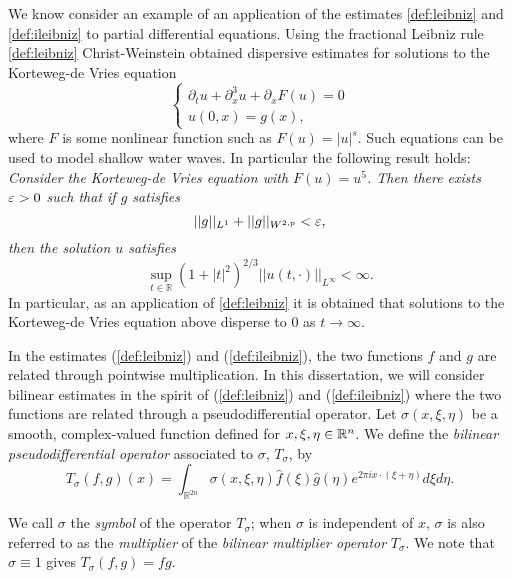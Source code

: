 We know consider an example of an application of the estimates \eqref{def:leibniz} and \eqref{def:ileibniz} to partial differential equations. Using the fractional Leibniz rule \eqref{def:leibniz} Christ-Weinstein \cite{MR1124294} obtained dispersive estimates for solutions to the Korteweg-de Vries equation 
\[ \begin{cases}
\partial_t u + \partial^3_x u + \partial_x F(u) = 0 \\
u(0,x) = g(x),
\end{cases} \]
where $F$ is some nonlinear function such as $F(u) = |u|^s$. Such equations can be used to model shallow water waves. In particular the following result holds: \textit{Consider the Korteweg-de Vries equation with $F(u) = u^5$. Then there exists $\varepsilon > 0$ such that if $g$ satisfies \[||g||_{L^1} + ||g||_{W^{2,p}} <\varepsilon,\]
then the solution $u$ satisfies \[\sup_{t\in\mathbb{R}} (1 + |t|^2)^{2/3} ||u(t,\cdot)||_{L^{\infty}} < \infty. \]}
In particular, as an application of \eqref{def:leibniz} it is obtained that solutions to the Korteweg-de Vries equation above disperse to $0$ as $t\rightarrow \infty.$


In the estimates (\ref{def:leibniz}) and (\ref{def:ileibniz}), the two functions $f$ and $g$ are related through pointwise multiplication. In this dissertation, we will consider bilinear estimates in the spirit of (\ref{def:leibniz}) and (\ref{def:ileibniz}) where the two functions are related through a pseudodifferential operator. Let $\sigma(x,\xi,\eta)$ be a smooth, complex-valued function defined for $x,\xi,\eta\in{{\mathbb R}^n}$. We define the \textit{bilinear pseudodifferential operator}  associated to $\sigma$, $T_\sigma$, by 
\begin{equation}\label{psydo}
T_{\sigma}(f,g)(x) = \int_{\mathbb{R}^{2n}} \sigma(x,\xi,\eta) \widehat{f}(\xi)\widehat{g}(\eta)e^{2\pi i x\cdot(\xi+\eta)}d\xi d\eta. 
\end{equation}

\noindent We call $\sigma$ the \textit{symbol} of the operator $T_\sigma$; when $\sigma$ is independent of $x$, $\sigma$ is also referred to as the \textit{multiplier} of the \textit{bilinear multiplier operator} $T_\sigma$. We note that $\sigma \equiv 1$ gives $T_\sigma(f,g) = fg$. 


